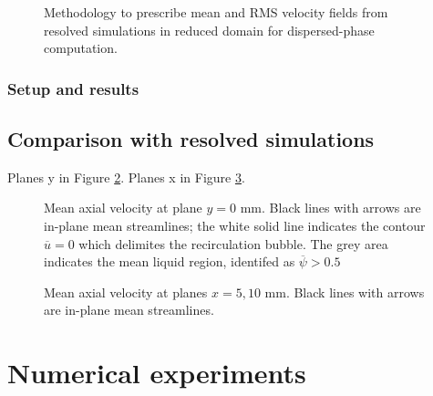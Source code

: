 \begin{figure}[h!]	
	\centering
	\caption{Methodology to prescribe mean and RMS velocity fields from resolved simulations in reduced domain for dispersed-phase computation.}
	\label{fig:custom_inlet_methodology}
\end{figure}


\subsubsection{Setup and results}




\subsection{Comparison with resolved simulations}

Planes y in Figure \ref{fig:JICF_lgs_gaseous_conditions_comparison_plane_y}. Planes x in Figure \ref{fig:JICF_lgs_gaseous_conditions_comparison_planes_x}. 

\begin{figure}[ht]
\centering
\caption[Mean axial velocity at plane $y = 0$ mm.]{Mean axial velocity at plane $y = 0$ mm. Black lines with arrows are in-plane mean streamlines; the white solid line indicates the contour $\overline{u} = 0$ which delimites the recirculation bubble. The grey area  indicates the mean liquid region, identifed as $\overline{\psi} > 0.5$}
\label{fig:JICF_lgs_gaseous_conditions_comparison_plane_y}
\end{figure}


\begin{figure}[ht]
\centering
\caption[Mean axial velocity at planes $x = 5, 10$ mm]{Mean axial velocity at planes $x = 5, 10$ mm. Black lines with arrows are in-plane mean streamlines.}
\label{fig:JICF_lgs_gaseous_conditions_comparison_planes_x}
\end{figure}

\clearpage

\section{Numerical experiments}

